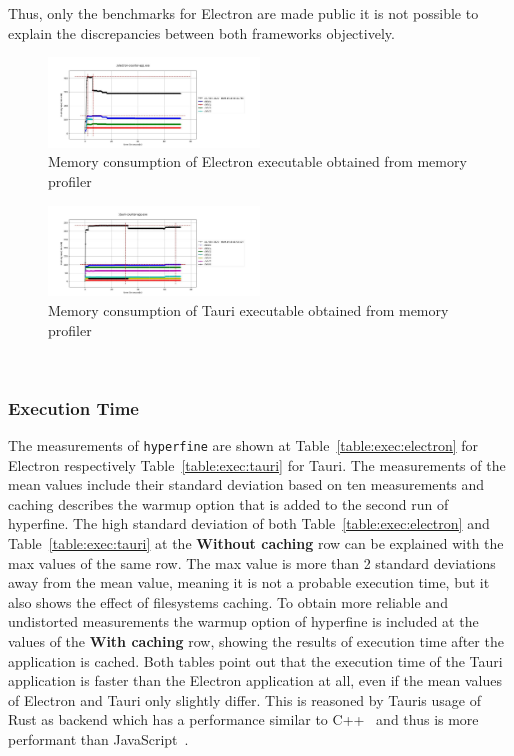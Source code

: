 Thus, only the benchmarks for Electron are made public it is not possible to explain the discrepancies between both frameworks objectively.
\begin{figure}[ht]
    \centering
    \includegraphics[width=0.5\textwidth]{images/ElectronMemCons}
    \caption[]{Memory consumption of Electron executable obtained from memory profiler}
    \label{fig:electron:memory}
\end{figure}
\begin{figure}[ht]
    \centering
    \includegraphics[width=0.5\textwidth]{images/TauriMemCons}
    \caption[]{Memory consumption of Tauri executable obtained from memory profiler}
    \label{fig:tauri:memory}
\end{figure}
\\
\subsubsection{Execution Time}
\label{subsubsec:perf:execution}

The measurements of \texttt{hyperfine} are shown at Table~\ref{table:exec:electron} for Electron respectively Table~\ref{table:exec:tauri} for Tauri.
The measurements of the mean values include their standard deviation based on ten measurements and caching describes the warmup option that is added to the second run of hyperfine.
The high standard deviation of both Table~\ref{table:exec:electron} and Table~\ref{table:exec:tauri} at the \textbf{Without caching} row can be explained with the max values of the same row.
The max value is more than 2 standard deviations away from the mean value, meaning it is not a probable execution time, but it also shows the effect of filesystems caching.
To obtain more reliable and undistorted measurements the warmup option of hyperfine is included at the values of the \textbf{With caching} row, showing the results of execution time after the application is cached.
Both tables point out that the execution time of the Tauri application is faster than the Electron application at all, even if the mean values of Electron and Tauri only slightly differ.
This is reasoned by Tauris usage of Rust as backend which has a performance similar to C++~\cite{rustPerformance} and thus is more performant than JavaScript~\cite{C++Javascript}.

